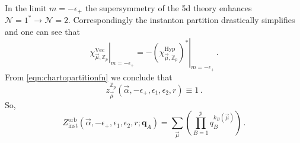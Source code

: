 \documentclass[main.tex]{subfiles}
\begin{document}
In the limit $m=-\epsilon_+$ the supersymmetry of the 5d theory enhances $\mathcal{N}=1^*\to\mathcal{N}=2$. Correspondingly the instanton partition drastically simplifies and one can see that
\begin{equation}
\left.\chi_{\vec{\mu},\mathbb{Z}_p}^{\text{Vec}}\right|_{m=-\epsilon_+}=-\left.\left(\chi_{\vec{\mu},\mathbb{Z}_p}^{\text{Hyp}}\right)^*\right|_{m=-\epsilon_+}\,.
\end{equation}
From \eqref{eqn:chartopartitionfn} we conclude that
\begin{equation}
z^{\mathbb{Z}_p}_{\vec{\mu}}\left(\vec{\alpha},-\epsilon_+,\epsilon_1,\epsilon_2,r\right)\equiv1\,.
\end{equation}
So,
\begin{equation}
Z_{\text{inst}}^{\text{orb}}\left(\vec{\alpha},-\epsilon_+,\epsilon_1,\epsilon_2,r;\mathbf{q}_A\right)=\sum_{\vec{\mu}}\left(\prod_{B=1}^pq_B^{k_B(\vec{\mu})}\right)\,.
\end{equation}
\end{document}

